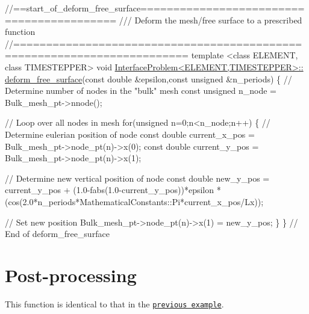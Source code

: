 \begin{DoxyCodeInclude}
\textcolor{comment}{//==start\_of\_deform\_free\_surface==========================================}
\textcolor{comment}{/// Deform the mesh/free surface to a prescribed function}
\textcolor{comment}{}\textcolor{comment}{//========================================================================}
\textcolor{keyword}{template} <\textcolor{keyword}{class} ELEMENT, \textcolor{keyword}{class} TIMESTEPPER>
\textcolor{keywordtype}{void} \hyperlink{classInterfaceProblem_a2319232b08d9df1ab473f6cbd40939d5}{InterfaceProblem<ELEMENT,TIMESTEPPER>::}
\hyperlink{classInterfaceProblem_a2319232b08d9df1ab473f6cbd40939d5}{deform\_free\_surface}(\textcolor{keyword}{const} \textcolor{keywordtype}{double} &epsilon,\textcolor{keyword}{const} \textcolor{keywordtype}{unsigned} &n\_periods)
\{
 \textcolor{comment}{// Determine number of nodes in the "bulk" mesh}
 \textcolor{keyword}{const} \textcolor{keywordtype}{unsigned} n\_node = Bulk\_mesh\_pt->nnode();
 
 \textcolor{comment}{// Loop over all nodes in mesh}
 \textcolor{keywordflow}{for}(\textcolor{keywordtype}{unsigned} n=0;n<n\_node;n++)
  \{
   \textcolor{comment}{// Determine eulerian position of node}
   \textcolor{keyword}{const} \textcolor{keywordtype}{double} current\_x\_pos = Bulk\_mesh\_pt->node\_pt(n)->x(0);
   \textcolor{keyword}{const} \textcolor{keywordtype}{double} current\_y\_pos = Bulk\_mesh\_pt->node\_pt(n)->x(1);
   
   \textcolor{comment}{// Determine new vertical position of node}
   \textcolor{keyword}{const} \textcolor{keywordtype}{double} new\_y\_pos = current\_y\_pos
    + (1.0-fabs(1.0-current\_y\_pos))*epsilon
    *(cos(2.0*n\_periods*MathematicalConstants::Pi*current\_x\_pos/Lx));
   
   \textcolor{comment}{// Set new position}
   Bulk\_mesh\_pt->node\_pt(n)->x(1) = new\_y\_pos;
  \}
\} \textcolor{comment}{// End of deform\_free\_surface}

\end{DoxyCodeInclude}




 

\hypertarget{index_doc}{}\section{Post-\/processing}\label{index_doc}
This function is identical to that in the \href{../../single_layer_free_surface/html/index.html#doc}{\tt previous example}.



